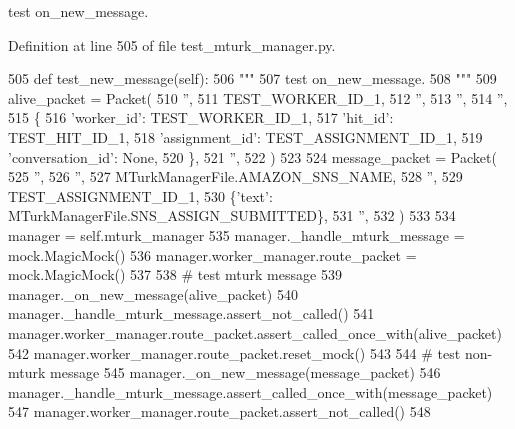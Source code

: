 \begin{DoxyVerb}test on_new_message.
\end{DoxyVerb}
 

Definition at line 505 of file test\+\_\+mturk\+\_\+manager.\+py.


\begin{DoxyCode}
505     \textcolor{keyword}{def }test\_new\_message(self):
506         \textcolor{stringliteral}{"""}
507 \textcolor{stringliteral}{        test on\_new\_message.}
508 \textcolor{stringliteral}{        """}
509         alive\_packet = Packet(
510             \textcolor{stringliteral}{''},
511             TEST\_WORKER\_ID\_1,
512             \textcolor{stringliteral}{''},
513             \textcolor{stringliteral}{''},
514             \textcolor{stringliteral}{''},
515             \{
516                 \textcolor{stringliteral}{'worker\_id'}: TEST\_WORKER\_ID\_1,
517                 \textcolor{stringliteral}{'hit\_id'}: TEST\_HIT\_ID\_1,
518                 \textcolor{stringliteral}{'assignment\_id'}: TEST\_ASSIGNMENT\_ID\_1,
519                 \textcolor{stringliteral}{'conversation\_id'}: \textcolor{keywordtype}{None},
520             \},
521             \textcolor{stringliteral}{''},
522         )
523 
524         message\_packet = Packet(
525             \textcolor{stringliteral}{''},
526             \textcolor{stringliteral}{''},
527             MTurkManagerFile.AMAZON\_SNS\_NAME,
528             \textcolor{stringliteral}{''},
529             TEST\_ASSIGNMENT\_ID\_1,
530             \{\textcolor{stringliteral}{'text'}: MTurkManagerFile.SNS\_ASSIGN\_SUBMITTED\},
531             \textcolor{stringliteral}{''},
532         )
533 
534         manager = self.mturk\_manager
535         manager.\_handle\_mturk\_message = mock.MagicMock()
536         manager.worker\_manager.route\_packet = mock.MagicMock()
537 
538         \textcolor{comment}{# test mturk message}
539         manager.\_on\_new\_message(alive\_packet)
540         manager.\_handle\_mturk\_message.assert\_not\_called()
541         manager.worker\_manager.route\_packet.assert\_called\_once\_with(alive\_packet)
542         manager.worker\_manager.route\_packet.reset\_mock()
543 
544         \textcolor{comment}{# test non-mturk message}
545         manager.\_on\_new\_message(message\_packet)
546         manager.\_handle\_mturk\_message.assert\_called\_once\_with(message\_packet)
547         manager.worker\_manager.route\_packet.assert\_not\_called()
548 
\end{DoxyCode}
\mbox{\label{classparlai_1_1mturk_1_1core_1_1dev_1_1test_1_1test__mturk__manager_1_1TestMTurkManagerUnitFunctions_a9439aba4f729dacb09ac64fd0dccbf0f}} 
